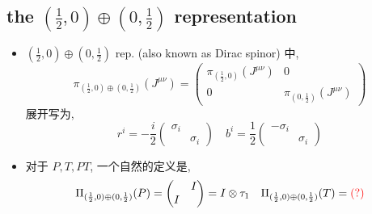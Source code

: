 \subsection{the \texorpdfstring{$(\frac{1}{2}, 0) \oplus (0, \frac{1}{2})$}{(1/2, 0)+(0, 1/2)} representation}
\begin{itemize}
	\item $(\frac{1}{2}, 0) \oplus (0, \frac{1}{2})$ rep. (also known as Dirac spinor) 中,
	\begin{equation}
		\pi_{(\frac{1}{2}, 0) \oplus (0, \frac{1}{2})}(J^{\mu \nu}) = \begin{pmatrix}
			\pi_{(\frac{1}{2}, 0)}(J^{\mu \nu}) & 0 \\
			0 & \pi_{(0, \frac{1}{2})}(J^{\mu \nu})
		\end{pmatrix}
	\end{equation}
	展开写为,
	\begin{equation}
		r^i = - \frac{i}{2} \begin{pmatrix}
			\sigma_i & \\
			& \sigma_i
		\end{pmatrix} \quad b^i = \frac{1}{2} \begin{pmatrix}
			- \sigma_i & \\
			& \sigma_i
		\end{pmatrix}
	\end{equation}
	
	\item 对于 $P, T, P T$, 一个自然的定义是,
	\begin{equation}
		\Pi_{(\frac{1}{2}, 0) \oplus (0, \frac{1}{2})}(P) = \begin{pmatrix}
			& I \\
			I &
		\end{pmatrix} = I \otimes \tau_1 \quad \Pi_{(\frac{1}{2}, 0) \oplus (0, \frac{1}{2})}(T) = \mathcolor{red}{(?)}
	\end{equation}
\end{itemize}

